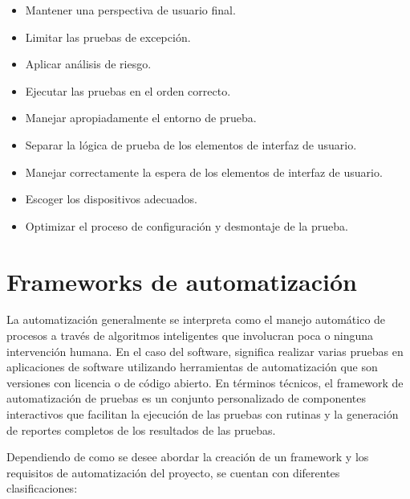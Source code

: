 \begin{itemize}
    \item Mantener una perspectiva de usuario final.
    \item Limitar las pruebas de excepción.
    \item Aplicar análisis de riesgo.
    \item Ejecutar las pruebas en el orden correcto.
    \item Manejar apropiadamente el entorno de prueba.
    \item Separar la lógica de prueba de los elementos de interfaz de usuario.
    \item Manejar correctamente la espera de los elementos de interfaz de
        usuario.
    \item Escoger los dispositivos adecuados.
    \item Optimizar el proceso de configuración y desmontaje de la prueba.
\end{itemize}

\section{Frameworks de automatización}
La automatización generalmente se interpreta como el manejo automático de
procesos a través de algoritmos inteligentes que involucran poca o ninguna
intervención humana. En el caso del software, significa realizar varias pruebas
en aplicaciones de software utilizando herramientas de automatización que son
versiones con licencia o de código abierto. En términos técnicos, el framework
de automatización de pruebas es un conjunto personalizado de componentes
interactivos que facilitan la ejecución de las pruebas con rutinas y la
generación de reportes completos de los resultados de las pruebas.

Dependiendo de como se desee abordar la creación de un framework y los
requisitos de automatización del proyecto, se cuentan con diferentes
clasificaciones:

